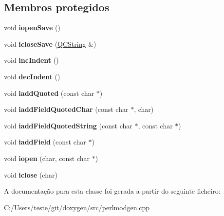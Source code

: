\subsection*{Membros protegidos}
\begin{DoxyCompactItemize}
\item 
\hypertarget{class_perl_mod_output_a13d0197da13377333f13f300c6e212f7}{void {\bfseries iopen\-Save} ()}\label{class_perl_mod_output_a13d0197da13377333f13f300c6e212f7}

\item 
\hypertarget{class_perl_mod_output_ae1a5f04f77a9b3d5b739f7f73351990e}{void {\bfseries iclose\-Save} (\hyperlink{class_q_c_string}{Q\-C\-String} \&)}\label{class_perl_mod_output_ae1a5f04f77a9b3d5b739f7f73351990e}

\item 
\hypertarget{class_perl_mod_output_a6927330c06f638a1a5ad01b0354d03dc}{void {\bfseries inc\-Indent} ()}\label{class_perl_mod_output_a6927330c06f638a1a5ad01b0354d03dc}

\item 
\hypertarget{class_perl_mod_output_a51e3b96a6fcca36628638caa239e93ff}{void {\bfseries dec\-Indent} ()}\label{class_perl_mod_output_a51e3b96a6fcca36628638caa239e93ff}

\item 
\hypertarget{class_perl_mod_output_aef12614fe23e7212fe8b808f322a396a}{void {\bfseries iadd\-Quoted} (const char $\ast$)}\label{class_perl_mod_output_aef12614fe23e7212fe8b808f322a396a}

\item 
\hypertarget{class_perl_mod_output_aa135229edc864722ef86c97522c04706}{void {\bfseries iadd\-Field\-Quoted\-Char} (const char $\ast$, char)}\label{class_perl_mod_output_aa135229edc864722ef86c97522c04706}

\item 
\hypertarget{class_perl_mod_output_a4eb62b88d465301514b809f62bfdb658}{void {\bfseries iadd\-Field\-Quoted\-String} (const char $\ast$, const char $\ast$)}\label{class_perl_mod_output_a4eb62b88d465301514b809f62bfdb658}

\item 
\hypertarget{class_perl_mod_output_a24a8c01cbc57f07974561043aedff475}{void {\bfseries iadd\-Field} (const char $\ast$)}\label{class_perl_mod_output_a24a8c01cbc57f07974561043aedff475}

\item 
\hypertarget{class_perl_mod_output_a4be79302e13ea9b9e688a3a85fe0fbe7}{void {\bfseries iopen} (char, const char $\ast$)}\label{class_perl_mod_output_a4be79302e13ea9b9e688a3a85fe0fbe7}

\item 
\hypertarget{class_perl_mod_output_ac7316b028a5bc888b666d7c7194c34a7}{void {\bfseries iclose} (char)}\label{class_perl_mod_output_ac7316b028a5bc888b666d7c7194c34a7}

\end{DoxyCompactItemize}


A documentação para esta classe foi gerada a partir do seguinte ficheiro\-:\begin{DoxyCompactItemize}
\item 
C\-:/\-Users/teste/git/doxygen/src/perlmodgen.\-cpp\end{DoxyCompactItemize}
